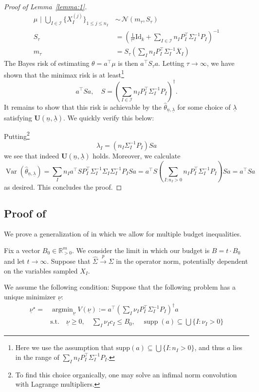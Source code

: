 \documentclass{article} %
\newcommand{\R}{\mathbb{R}}
\DeclareMathOperator{\Var}{Var}
\DeclareMathOperator{\supp}{supp}
\newcommand{\ul}[1]{\underline{#1}}
\DeclareMathOperator{\argmin}{argmin}
\begin{document}
\begin{proof}[Proof of Lemma~\ref{lemma:1}]
    \begin{align*}
        \mu\,\,\bigg|\,\,\bigcup_{I\in\mathcal{I}}\{X_I^{(j)}\}_{1\leq j\leq n_I} \,&\sim\, \mathcal{N}(m_\tau,S_\tau) \\
        S_\tau &= \left(\frac{1}{\tau^2}\text{Id}_k + \sum_{I\in\mathcal{I}}n_I P_I^\top \Sigma_I^{-1}P_I \right)^{-1} \\
        m_\tau &= S_\tau\left(\sum_{I}n_I P_I^\top \Sigma_I^{-1}\overline{X}_I\right)
    \end{align*}
    The Bayes risk of estimating $\theta=a^\top \mu$ is then $a^\top S_\tau a$. Letting $\tau\to\infty$, we have shown that the minimax risk is at least\footnote{Here we use the assumption that $\text{supp}(a)\subseteq \bigcup\{I:n_I>0\}$, and thus $a$ lies in the range of $\sum_I n_IP_I^\top \Sigma_I^{-1}P_I$.}
    \[
    a^\top Sa,\quad S = \left(\sum_{I\in\mathcal{I}}n_I P_I^\top \Sigma_I^{-1}P_I \right)^\dagger.
    \]
    It remains to show that this risk is achievable by the $\hat{\theta}_{\underline{n},\underline{\lambda}}$ for some choice of $\underline{\lambda}$ satisfying $\mathbf{U}(\underline{n},\underline{\lambda})$. We quickly verify this below:

    Putting\footnote{To find this choice organically, one may solve an infimal norm convolution with Lagrange multipliers.}
    \[
    \lambda_I = \left(n_I \Sigma_I^{-1}P_I\right)S a
    \]
    we see that indeed $\mathbf{U}(\underline{n},\underline{\lambda})$ holds. Moreover, we calculate
    \[
    \Var(\hat{\theta}_{\underline{n},\underline{\lambda}})=\sum_{I} n_Ia^\top SP_I^\top \Sigma_I^{-1}\Sigma_I\Sigma_I^{-1}P_ISa = a^\top S \left(\sum_{I:n_I>0}n_I P_I^\top \Sigma_I^{-1}P_I\right)S a = a^\top Sa
    \]
    as desired. This concludes the proof.
\end{proof}

\subsection{Proof of }\label{sec:asymptotic_proof}
We prove a generalization of  in which we allow for multiple budget inequalities.

Fix a vector $B_0\in \R^m_{>0}$. We consider the limit in which our budget is $B=t\cdot B_0$ and let $t\to\infty$. Suppose that $\widehat{\Sigma}\overset{p}{\to} \Sigma$ in the operator norm, potentially dependent on the variables sampled $X_I$.

We assume the following condition: Suppose that the following problem has a unique minimizer $\ul{\nu}$:
\begin{equation}\label{eqn:condition}
\begin{split}
    \ul{\nu}^\star = &\argmin_{\ul{\nu}} V(\ul{\nu}) :=a^\top\left(\sum_I \nu_I P_I^\top \Sigma_I^{-1} P_I\right)^\dagger a \\
    & \text{s.t.}\quad \ul{\nu}\geq0,\quad \sum_I \nu_I c_I\leq B_0,\quad \supp(a)\subseteq\bigcup \{I:\nu_I>0\}
\end{split}
\end{equation}
\end{document}
